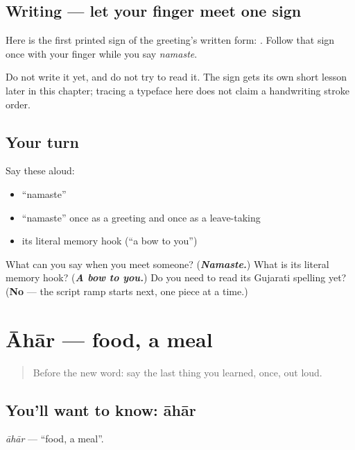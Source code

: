 \subsection*{Writing — let your finger meet one sign}
Here is the first printed sign of the greeting's written form: \textbf{}. Follow that sign once with your finger while you say \emph{namaste}.

Do not write it yet, and do not try to read it. The sign gets its own short lesson later in this chapter; tracing a typeface here does not claim a handwriting stroke order.

\subsection*{Your turn}
Say these aloud:

\begin{itemize}
\raggedright
  \item \textquotedblleft{}namaste\textquotedblright{}
  \item \textquotedblleft{}namaste\textquotedblright{} once as a greeting and once as a leave-taking
  \item its literal memory hook (\textquotedblleft{}a bow to you\textquotedblright{})
\end{itemize}

\begin{tcolorbox}[breakable,colback=teal!4,colframe=teal!35!black,title={Before you move on}]
What can you say when you meet someone? (\emph{\textbf{Namaste.}}) What is its literal memory hook? (\emph{\textbf{A bow to you.}}) Do you need to read its Gujarati spelling yet? (\textbf{No} — the script ramp starts next, one piece at a time.)
\end{tcolorbox}
\section[\texorpdfstring{\gu{આહાર} (āhār)}{આહાર (āhār)}]{Āhār — food, a meal}

\label{lesson:GU-C01-aahaar}



\begin{quote}
Before the new word: say the last thing you learned, once, out loud.
\end{quote}

\subsection*{You'll want to know: āhār}
\emph{āhār} — \textquotedblleft{}food, a meal\textquotedblright{}.

